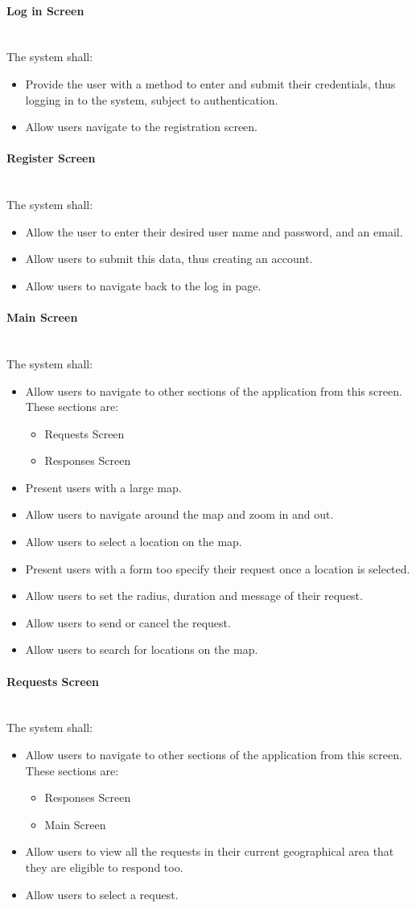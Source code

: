 \documentclass[a4paper]{article}
\newcommand{\subsubsubsection}[1]{\paragraph{#1}\mbox{}\\}
\begin{document}
\subsubsubsection{Log in Screen}
The system shall:
\begin{itemize}
  \item Provide the user with a method to enter and submit their      credentials, thus logging in to the system, subject to      authentication.
  \item Allow users navigate to the registration screen.
\end{itemize}
\subsubsubsection{Register Screen}
The system shall:
\begin{itemize}
  \item Allow the user to enter their desired user name and password, and an email.
  \item Allow users to submit this data, thus creating an account.
  \item Allow users to navigate back to the log in page.
\end{itemize}
\subsubsubsection{Main Screen}
The system shall:
\begin{itemize}
  \item Allow users to navigate to other sections of the application from this screen. These sections are:
\begin{itemize}
\item Requests Screen
\item Responses Screen
\end{itemize}
\item Present users with a large map.
\item Allow users to navigate around the map and zoom in and out.
\item Allow users to select a location on the map.
\item Present users with a form too specify their request once a location is selected.
\item Allow users to set the radius, duration and message of their request.
\item Allow users to send or cancel the request.
\item Allow users to search for locations on the map.
\end{itemize}
\subsubsubsection{Requests Screen}
The system shall:
\begin{itemize}

\item Allow users to navigate to other sections of the application from this screen. These sections are:
\begin{itemize}
\item Responses Screen
\item Main Screen
\end{itemize}
\item Allow users to view all the requests in their current geographical area that they are eligible to respond too.
\item Allow users to select a request.
\end{itemize}
\end{document}

